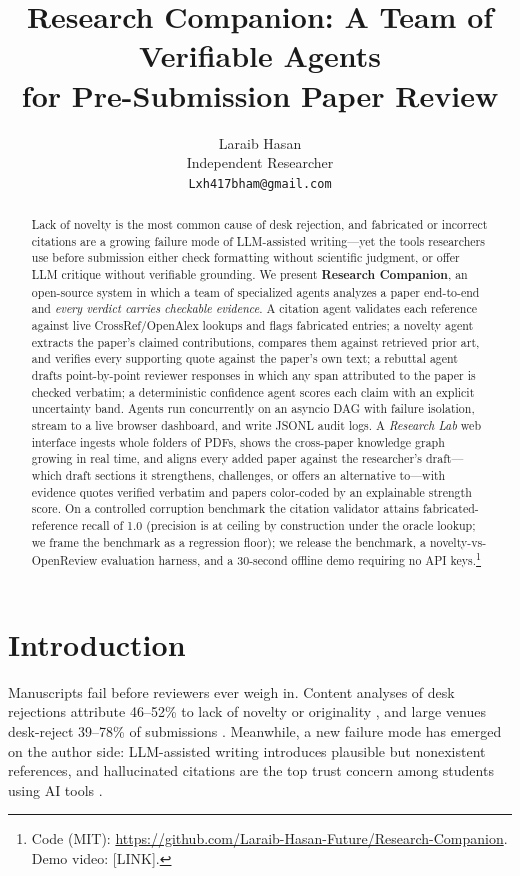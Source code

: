 \documentclass[11pt]{article}
\title{Research Companion: A Team of Verifiable Agents \\ for Pre-Submission Paper Review}
\author{Laraib Hasan \\
  Independent Researcher \\
  \texttt{Lxh417bham@gmail.com}}
\begin{document}
\maketitle

\begin{abstract}
Lack of novelty is the most common cause of desk rejection, and fabricated or incorrect citations are a growing failure mode of LLM-assisted writing---yet the tools researchers use before submission either check formatting without scientific judgment, or offer LLM critique without verifiable grounding. We present \textbf{Research Companion}, an open-source system in which a team of specialized agents analyzes a paper end-to-end and \emph{every verdict carries checkable evidence}. A citation agent validates each reference against live CrossRef/OpenAlex lookups and flags fabricated entries; a novelty agent extracts the paper's claimed contributions, compares them against retrieved prior art, and verifies every supporting quote against the paper's own text; a rebuttal agent drafts point-by-point reviewer responses in which any span attributed to the paper is checked verbatim; a deterministic confidence agent scores each claim with an explicit uncertainty band. Agents run concurrently on an asyncio DAG with failure isolation, stream to a live browser dashboard, and write JSONL audit logs. A \emph{Research Lab} web interface ingests whole folders of PDFs, shows the cross-paper knowledge graph growing in real time, and aligns every added paper against the researcher's draft---which draft sections it strengthens, challenges, or offers an alternative to---with evidence quotes verified verbatim and papers color-coded by an explainable strength score. On a controlled corruption benchmark the citation validator attains fabricated-reference recall of 1.0 (precision is at ceiling by construction under the oracle lookup; we frame the benchmark as a regression floor); we release the benchmark, a novelty-vs-OpenReview evaluation harness, and a 30-second offline demo requiring no API keys.\footnote{Code (MIT): \url{https://github.com/Laraib-Hasan-Future/Research-Companion}. Demo video: [LINK].}
\end{abstract}

\section{Introduction}
Manuscripts fail before reviewers ever weigh in. Content analyses of desk rejections attribute 46--52\% to lack of novelty or originality \citep{menon2022desk,dantastorres2022desk}, and large venues desk-reject 39--78\% of submissions \citep{dantastorres2022desk,bauchner2017jama}. Meanwhile, a new failure mode has emerged on the author side: LLM-assisted writing introduces plausible but nonexistent references, and hallucinated citations are the top trust concern among students using AI tools \citep{hepi2025survey}.
\end{document}
